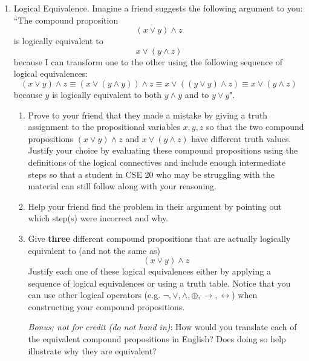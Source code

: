\documentclass[12pt, oneside]{article}
\begin{document}
\begin{enumerate}[labelindent=0pt, leftmargin=0pt]
\begin{enumerate}
        \end{enumerate}

        \item Logical Equivalence. Imagine a friend suggests the following argument to you: ``The compound proposition
        \[
        (x \lor y) \land z
        \]
        is logically equivalent to 
        \[
        x \lor (y \land z)
        \]
        because I can transform one to the other using the following sequence of logical equivalences: 
        \[
           (x \lor y) \land z \equiv
           (x \lor (y \land y)) \land z \equiv
           x \lor ( (y \lor y) \land z) \equiv x \lor (y \land z) 
        \]
        because $y$ is logically equivalent to both $y \land y$ and to $y \lor y$".
        
        \begin{enumerate}
        \item Prove to your friend that they made a mistake by giving a truth
        assignment to the propositional variables $x,y,z$ so that 
        the two compound propositions 
        $ (x \lor y) \land z$ and $ x \lor (y \land z)$ have different truth values.
        Justify your choice by evaluating these compound propositions using the definitions of the logical connectives 
        and include enough intermediate steps so that a student in CSE 20 who may be 
        struggling with the material can still follow along with your reasoning.
        
        \item
        Help your friend find the problem in their argument by pointing out which step(s) were incorrect and why.
        
        \item Give {\bf three} different compound propositions
        that are actually logically equivalent to (and not the same as)
        \[
            (x \lor y) \land z
        \]
        Justify each one of these logical equivalences either by applying a sequence of logical equivalences
        or using a truth table.  Notice that you can use other logical operators (e.g. $\lnot, \lor, \land, \oplus, \to, 
        \leftrightarrow$) 
        when constructing your compound propositions.
     
        {\it Bonus; not for credit (do not hand in)}: How would you translate each of the equivalent compound
        propositions in English? Does doing so help illustrate why they are equivalent?
        \end{enumerate}
        

\end{enumerate}
\end{document}
